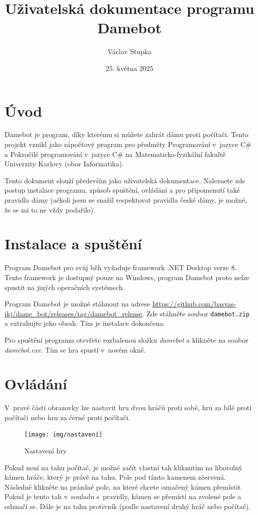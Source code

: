 \documentclass[a4paper,12pt]{article}
\title{Uživatelská dokumentace programu Damebot}
\author{Václav Stupka}
\date{25. května 2025}
\begin{document}
	\maketitle
	\tableofcontents
	
	\section{Úvod}
	Damebot je program, díky kterému si můžete zahrát dámu proti počítači. Tento projekt vznikl jako zápočtový program
	pro předměty Programování v~jazyce C\# a Pokročilé programování v~jazyce C\# na Matematicko-fyzikální fakultě Univerzity
	Karlovy (obor Informatika). 
	
	Tento dokument slouží především jako uživatelská dokumentace. Naleznete zde postup instalace programu, způsob spuštění,
	ovládání a pro při\-po\-me\-nu\-tí také pravidla dámy (ačkoli jsem se snažil respektovat pravidla české dámy, je možné, že se
	mi to ne vždy podařilo).
	
	\section{Instalace a spuštění}
	Program Damebot pro svůj běh vyžaduje framework .NET Desktop verze 8. Tento framework je dostupný pouze na Windows, program Damebot proto nelze spustit na jiných operačních systémech.
	
	Program Damebot je možné stáhnout na adrese
	\url{https://github.com/basvas-jkj/dame_bot/releases/tag/damebot_release}.
	Zde stáhněte soubor \texttt{damebot.zip}
	a extrahujte jeho obsah. Tím je instalace dokončena.
	
	Pro spuštění programu otevřete rozbalenou složku \textit{damebot} a klikněte na soubor \textit{damebot.exe}.
	Tím se hra spustí v~novém okně.
	
	\section{Ovládání}
	V~pravé části obrazovky lze nastavit hru dvou hráčů proti sobě, hru za bílé proti počítači nebo hru za černé proti počítači.
	
	
	\begin{figure}[h]
		\centering
		\texttt{[image: img/nastavení]}
		\caption{Nastavení hry}
	\end{figure}
	
	
	Pokud není na tahu počítač, je možné začít vlastní tah kliknutím na libovolný kámen hráče, který je právě na tahu.
	Pole pod tímto kamenem zčervená. Následně klikněte na prázdné pole, na které chcete označený kámen přemístit. Pokud je tento tah v~souladu s~pravidly, kámen se přemístí na zvolené pole a odznačí se. Dále je na tahu protivník (podle nastavení druhý hráč nebo počítač).
	
\end{document}
